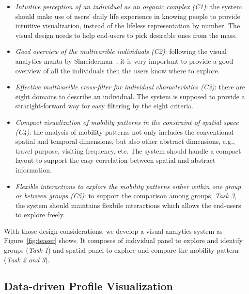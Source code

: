 \begin{itemize}
\item \textit{Intuitive perception of an individual as an organic complex (C1)}: the system should make use of users' daily life experience in knowing people to provide intuitive visualization, instead of the lifeless representation by number. The visual design needs to help end-users to pick desirable ones from the mass. 
\item \textit{Good overview of the multivarible individuals (C2)}: following the visual analytics manta by Shneiderman~\cite{RN459}, it is very important to provide a good overview of all the individuals then the users know where to explore. 
\item \textit{Effective multivarible cross-filter for individual characteristics (C3)}: there are eight domains to describe an individual. The system is supposed to provide a straright-forward way for easy filtering by the eight criteria. 
\item \textit{Compact visualization of mobility patterns in the constraint of spatial space (C4)}: the analysis of mobility patterns not only includes the conventional spatial and temporal dimensions, but also other abstract dimensions, e.g., travel purpose, visiting frequency, etc. The system should handle a compact layout to support the easy correlation between spatial and abstract information. 
\item \textit{Flexible interactions to explore the mobility patterns either within one group or between groups (C5)}: to support the comparison among groups, \textit{Task 3}, the system should maintains flexbile interactions which allows the end-users to explore freely.
\end{itemize}


With those design considerations, we develop a visual analytics system as Figure~\ref{fig:teaser} shows. It composes of individual panel to explore and identify groups (\textit{Task 1}) and spatial panel to explore and compare the mobility pattern (\textit{Task 2 and 3}). 


\subsection{Data-driven Profile Visualization}

